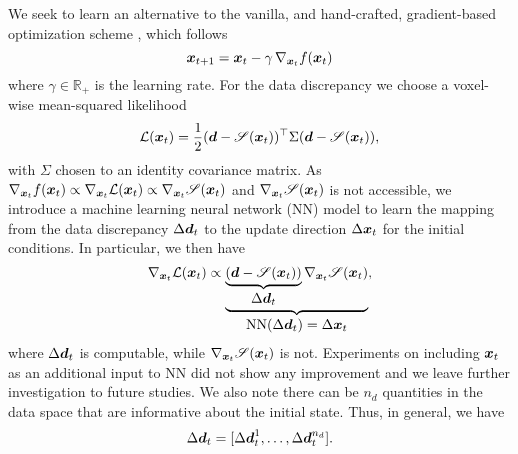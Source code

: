 We seek to learn an alternative to the vanilla, and hand-crafted, gradient-based optimization scheme \citep[see e.g. review by][]{Ruder2016}, which follows
\begin{equation}
\label{eq:update}
\boldsymbol{x}_{t+1} = \boldsymbol{x}_{t} - \gamma\, \nabla_{\boldsymbol{x}_{t}} f(\boldsymbol{x}_{t})
\end{equation}
where $\gamma \in \mathbb{R}_+$ is the learning rate. For the data discrepancy we choose a voxel-wise mean-squared likelihood
\begin{equation}
    \mathcal{L}(\boldsymbol{x}_t) = \frac{1}{2}(\boldsymbol{d}-\mathscr{S}(\boldsymbol{x}_t))^\top\Sigma (\boldsymbol{d}-\mathscr{S}(\boldsymbol{x}_t)),
    \label{eq:mse}
\end{equation}
with $\Sigma$ chosen to an identity covariance matrix. As $\nabla_{\boldsymbol{x}_{t}} f(\boldsymbol{x}_{t}) \propto \nabla_{\boldsymbol{x}_{t}} \mathcal{L}(\boldsymbol{x}_t) \propto \nabla_{\boldsymbol{x}_{t}} \mathscr{S}(\boldsymbol{x}_t)$ and $\nabla_{\boldsymbol{x}_{t}} \mathscr{S}(\boldsymbol{x}_t)$ is not accessible, we introduce a machine learning neural network (NN) model to learn the mapping from the data discrepancy $\Delta \boldsymbol{d}_{t}$ to the update direction $\Delta \boldsymbol{x}_{t}$ for the initial conditions. 
In particular, we then have
\begin{equation}
    \nabla_{\boldsymbol{x}_{t}} \mathcal{L}(\boldsymbol{x}_t) \propto \underbrace{\underbrace{\left(\boldsymbol{d} - \mathscr{S}(\boldsymbol{x}_{t})\right)}_{\textstyle \Delta \boldsymbol{d}_{t}} \nabla_{\boldsymbol{x}_{t}} \mathscr{S}(\boldsymbol{x}_{t})}_{\textstyle \mathrm{NN}(\Delta \boldsymbol{d}_{t})=\Delta \boldsymbol{x}_{t}},
    \label{eq:grad}
\end{equation}
where $\Delta \boldsymbol{d}_{t}$  is computable, while $\nabla_{\boldsymbol{x}_{t}} \mathscr{S}(\boldsymbol{x}_{t})$ is not. Experiments on including $\boldsymbol{x}_{t}$ as an additional input to NN did not show any improvement and we leave further investigation to future studies. 
We also note there can be $n_d$ quantities in the data space that are informative about the initial state. Thus, in general, we have
\begin{equation}
    \Delta \boldsymbol{d}_{t} = [\Delta \boldsymbol{d}_{t}^1,\dots,\Delta \boldsymbol{d}_{t}^{n_d}].
    \label{eq:multi_data}
\end{equation}
